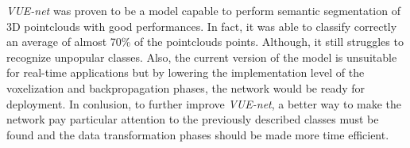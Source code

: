\textit{VUE-net} was proven to be a model capable to perform semantic segmentation of 3D pointclouds
with good performances. In fact, it was able to classify correctly an average of almost 70\%
of the pointclouds points. Although, it still struggles to recognize unpopular classes.
Also, the current version of the model is unsuitable for real-time applications but by lowering the implementation level
of the voxelization and backpropagation phases, the network would be ready for deployment. 
In conlusion, to further improve \textit{VUE-net}, a better way to
make the network pay particular attention to the previously described classes must be found and the data transformation
phases should be made more time efficient.